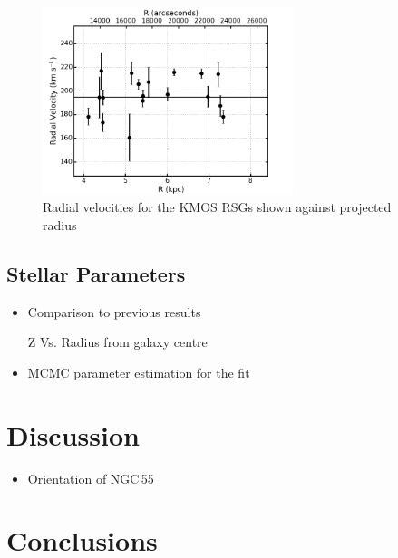 \begin{figure}
 \centering
 \includegraphics[width=0.65\textwidth]{ngc55/ngc55-RvsRV-F1}
 \caption[Radial velocities for the KMOS RSGs shown against projected radius]{
 Radial velocities for the KMOS RSGs shown against projected radius
         }

 \label{fig:ngc55}
\end{figure}
\subsection{Stellar Parameters} %
\label{sub:stellar_parameters}
\begin{itemize}
    \item Comparison to previous results
    \item [Z] Vs. Radius from galaxy centre
    \item MCMC parameter estimation for the fit
    \end{itemize}



\section{Discussion} %
\label{sec:discussion}

\begin{itemize}
    \item Orientation of NGC\,55
\end{itemize}

\section{Conclusions} %
\label{sec:conclusions}


